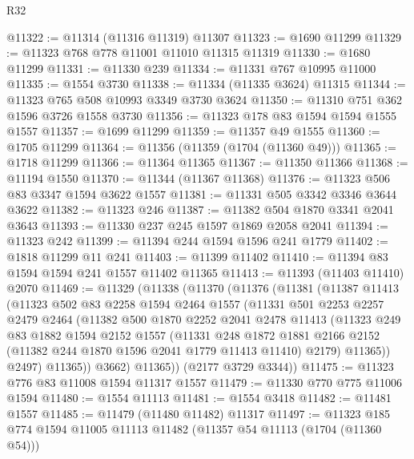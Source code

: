 \begin{lexlean}{R32}
\begin{coremodule}
@11322 := @11314 (@11316 @11319) @11307
@11323 := @1690 @11299
@11329 := @11323 @768 @778 @11001 @11010 @11315 @11319
@11330 := @1680 @11299
@11331 := @11330 @239
@11334 := @11331 @767 @10995 @11000
@11335 := @1554 @3730
@11338 := @11334 (@11335 @3624) @11315
@11344 := @11323 @765 @508 @10993 @3349 @3730 @3624
@11350 := @11310 @751 @362 @1596 @3726 @1558 @3730
@11356 := @11323 @178 @83 @1594 @1594 @1555 @1557
@11357 := @1699 @11299
@11359 := @11357 @49 @1555
@11360 := @1705 @11299
@11364 := @11356 (@11359 (@1704 (@11360 @49)))
@11365 := @1718 @11299
@11366 := @11364 @11365
@11367 := @11350 @11366
@11368 := @11194 @1550
@11370 := @11344 (@11367 @11368)
@11376 := @11323 @506 @83 @3347 @1594 @3622 @1557
@11381 := @11331 @505 @3342 @3346 @3644 @3622
@11382 := @11323 @246
@11387 := @11382 @504 @1870 @3341 @2041 @3643
@11393 := @11330 @237 @245 @1597 @1869 @2058 @2041
@11394 := @11323 @242
@11399 := @11394 @244 @1594 @1596 @241 @1779
@11402 := @1818 @11299 @11 @241
@11403 := @11399 @11402
@11410 := @11394 @83 @1594 @1594 @241 @1557 @11402 @11365
@11413 := @11393 (@11403 @11410) @2070
@11469 := @11329
    (@11338
      (@11370
        (@11376
          (@11381
            (@11387
              @11413
              (@11323
                @502
                @83
                @2258
                @1594
                @2464
                @1557
                (@11331
                  @501
                  @2253
                  @2257
                  @2479
                  @2464
                  (@11382
                    @500
                    @1870
                    @2252
                    @2041
                    @2478
                    @11413
                    (@11323
                      @249
                      @83
                      @1882
                      @1594
                      @2152
                      @1557
                      (@11331
                        @248
                        @1872
                        @1881
                        @2166
                        @2152
                        (@11382 @244 @1870 @1596 @2041 @1779 @11413 @11410)
                        @2179)
                      @11365))
                  @2497)
                @11365))
            @3662)
          @11365))
      (@2177 @3729 @3344))
@11475 := @11323 @776 @83 @11008 @1594 @11317 @1557
@11479 := @11330 @770 @775 @11006 @1594
@11480 := @1554 @11113
@11481 := @1554 @3418
@11482 := @11481 @1557
@11485 := @11479 (@11480 @11482) @11317
@11497 := @11323 @185 @774 @1594 @11005 @11113 @11482 (@11357 @54 @11113 (@1704 (@11360 @54)))

\end{coremodule}
\end{lexlean}
